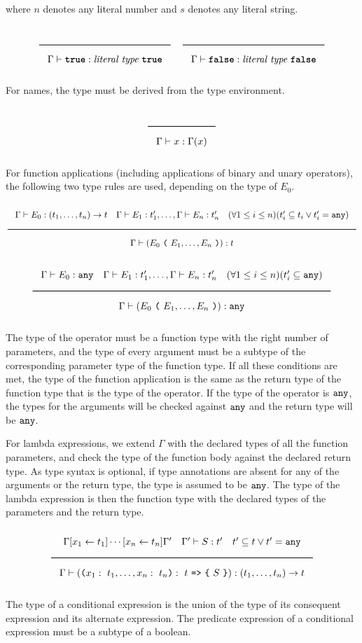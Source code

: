 where $n$ denotes any literal number and $s$ denotes any literal string.

\noindent
\[
  \Rule{}{\Gamma \vdash \TruE : \textit{literal type}\ \TruE}
  \quad
  \Rule{}{\Gamma \vdash \FalsE : \textit{literal type}\ \FalsE}
\]
\noindent

For names, the type must be derived from the type environment.

\noindent
\[
  \Rule{}{\Gamma \vdash x : \Gamma(x)}
\]
\noindent

For function applications (including applications of binary and unary operators), the following two type rules are used, depending on the type of $E_0$.

\noindent
\[
\Rule{\Gamma \vdash E_0 : (t_1, \ldots, t_n) \rightarrow t \quad \Gamma \vdash E_1 : t'_1, \ldots,  \Gamma \vdash E_n : t'_n
  \quad (\forall 1 \leq i \leq n)(t'_i \subseteq t_i \vee t'_i = \Any)}{\Gamma \vdash (E_0\ \Lp \ E_1, \ldots, E_n\ \Rp) : t}
\]
\noindent
\[
  \Rule{\Gamma \vdash E_0 : \Any \quad \Gamma \vdash E_1 : t'_1, \ldots,  \Gamma \vdash E_n : t'_n
  \quad (\forall 1 \leq i \leq n)(t'_i \subseteq \Any)}{\Gamma \vdash (E_0\ \Lp \ E_1, \ldots, E_n\ \Rp) : \Any}
\]
\noindent

The type of the operator must be a function type with the right number of parameters,
and the type of every argument must be a subtype of the corresponding parameter type of the function type.
If all these conditions are met, the type of the function application is the same
as the return type of the function type that is the type of the operator.
If the type of the operator is $\texttt{any}$, the types for the arguments will be checked against $\texttt{any}$ and the return type will be $\texttt{any}$.

For lambda expressions, we extend $\Gamma$ with the declared types of all the function parameters,
and check the type of the function body against the declared return type.
As type syntax is optional, if type annotations are absent for any of the arguments or the return type, the type is assumed to be $\texttt{any}$.
The type of the lambda expression is then the function type with the declared types of the parameters and the return type. 

\noindent
\[
  \Rule{\Gamma [x_1 \leftarrow t_1] \cdots [x_n \leftarrow t_n] \Gamma' \quad \Gamma' \vdash S : t' \quad t' \subseteq t \vee t' = \Any}{
    \Gamma \vdash ( \Lp  x_1:\ t_1, \ldots, x_n:\ t_n \Rp :\ t\ \texttt{=>}\ \Lc\ S\ \Rc) : (t_1, \ldots, t_n) \rightarrow t}  
\]
\noindent

The type of a conditional expression is the union of the type of its consequent expression and its alternate expression.
The predicate expression of a conditional expression must be a subtype of a boolean.

